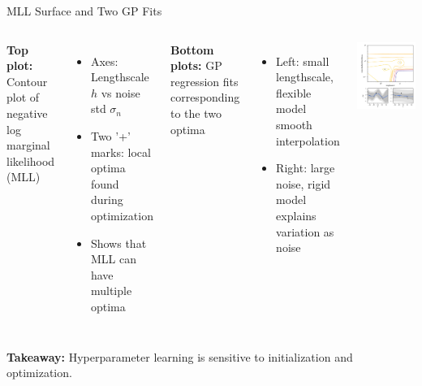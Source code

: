 \documentclass[handout,aspectratio=169]{beamer}
\begin{document}
\begin{frame}{MLL Surface and Two GP Fits}
\begin{columns}
\textbf{Top plot:} Contour plot of negative log marginal likelihood (MLL)

\begin{itemize}
    \item Axes: Lengthscale $h$ vs noise std $\sigma_n$
    \item Two '+' marks: local optima found during optimization
    \item Shows that MLL can have multiple optima
\end{itemize}

\pause
\vspace{0.3cm}
\textbf{Bottom plots:} GP regression fits corresponding to the two optima

\begin{itemize}
    \item Left: small lengthscale, flexible model \rightarrow \, smooth interpolation
    \item Right: large noise, rigid model \rightarrow \, explains variation as noise
\end{itemize}

\includegraphics[width=0.8\linewidth]{chapter_figs/04_figs/f410.png}
\end{columns}

\vspace{0.3cm}
\textbf{Takeaway:} Hyperparameter learning is sensitive to initialization and optimization.
\end{frame}
\end{document}
